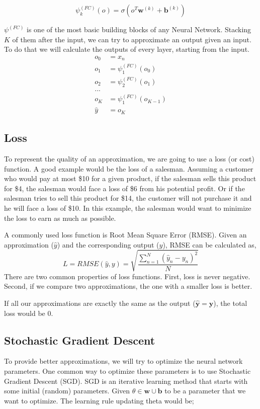 $$ \psi^{(FC)}_k(o) = \sigma(o^T\mathbf{w}^{(k)} + \mathbf{b}^{(k)})$$

$\psi^{(FC)}$ is one of the most basic building blocks of any Neural Network. Stacking $K$ of them after the input, we can try to approximate an output given an input. To do that we will calculate the outputs of every layer, starting from the input. 
\begin{equation*}
\begin{split}
o_0 &= x_n\\
o_1 &= \psi_1^{(FC)}(o_0)\\ 
o_2 &= \psi_2^{(FC)}(o_1)\\
...&\\
o_K &= \psi_1^{(FC)}(o_{K-1})\\
\hat y &= o_K
\end{split}
\end{equation*}

\subsection{Loss}
To represent the quality of an approximation, we are going to use a loss (or cost) function. A good example would be the loss of a salesman. Assuming a customer who would pay at most \$10 for a given product, if the salesman sells this product for \$4, the salesman would face a loss of \$6 from his potential profit. Or if the salesman tries to sell this product for \$14, the customer will not purchase it and he will face a loss of \$10. In this example, the salesman would want to minimize the loss to earn as much as possible. 

A commonly used loss function is Root Mean Square Error (RMSE). Given an approximation ($\hat y$) and the corresponding output ($y$), RMSE can be calculated as,
\begin{equation*}
L = RMSE(\hat y, y) = \sqrt{\frac{\sum^N_{n=1} (\hat y_n - y_n)^2 }{N}}
\end{equation*}
There are two common properties of loss functions. First, loss is never negative. Second, if we compare two approximations, the one with a smaller loss is better.

If all our approximations are exactly the same as the output ($  \mathbf{\hat y} =  \mathbf{y} $), the total loss would be 0. 

\subsection{Stochastic Gradient Descent}
To provide better approximations, we will try to optimize the neural network parameters. One common way to optimize these parameters is to use Stochastic Gradient Descent (SGD). SGD is an iterative learning method that starts with some initial (random) parameters. Given $\theta \in \mathbf{w} \cup \mathbf{b}$ to be a parameter that we want to optimize. The learning rule updating theta would be;

